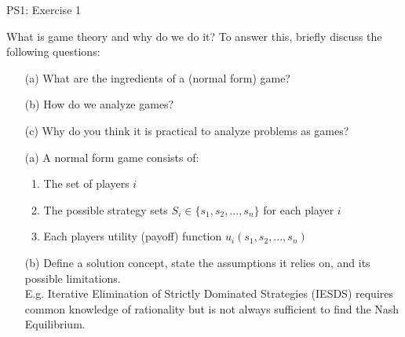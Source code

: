 \begin{frame}{PS1: Exercise 1}
\begin{multicols}{2}
What is game theory and why do we do it? To answer this, briefly discuss the following questions:
\begin{itemize}
  \item[(a)] What are the ingredients of a (normal form) game?
  \item[(b)] How do we analyze games?
  \item[(c)] Why do you think it is practical to analyze problems as games?
\end{itemize}
\vfill\null
\columnbreak
\begin{itemize}
  \item[(a)] A normal form game consists of:
    \begin{enumerate}
      \item The set of players $i$
      \item The possible strategy sets $S_i\in \{s_1,s_2,...,s_n\}$ for each player $i$
      \item Each players utility (payoff) function $u_i(s_1,s_2,...,s_n)$
    \end{enumerate}
  \item[(b)] Define a solution concept, state the assumptions it relies on, and its possible limitations.\\
  E.g. Iterative Elimination of Strictly Dominated Strategies (IESDS) requires common knowledge of rationality but is not always sufficient to find the Nash Equilibrium.
\end{itemize}
\vfill\null
\end{multicols}
\end{frame}

